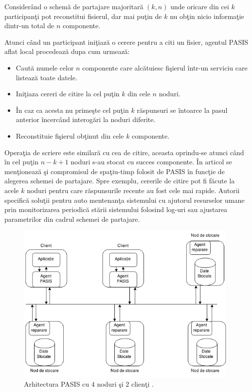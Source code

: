 \documentclass{llncs}
\begin{document}
Consider\^{a}nd o schem\u{a} de partajare majoritar\u{a} $(k, n)$ unde oricare din cei $k$ participan\c{t}i pot reconstitui fisierul, dar mai pu\c{t}in de $k$ nu ob\c{t}in nicio informa\c{t}ie dintr-un total de $n$ componente. 

Atunci c\^{a}nd un participant ini\c{t}iaz\u{a} o cerere pentru a citi un fisier, agentul PASIS aflat local procedeaz\u{a} dupa cum urmeaz\u{a}:
\begin{itemize}
	\item Caut\u{a} numele celor $n$ componente care alc\u{a}tuiesc fi\c{s}ierul \^{i}ntr-un serviciu care listeaz\u{a} toate datele.
	\item Ini\c{t}iaza cereri de citire la cel pu\c{t}in $k$ din cele $n$ noduri.
	\item \^{I}n caz ca acesta nu prime\c{s}te cel pu\c{t}in $k$ r\u{a}spunsuri se \^{i}ntoarce la pasul anterior \^{i}ncerc\^{a}nd interog\u{a}ri la noduri diferite.
	\item Reconstituie fi\c{s}ierul ob\c{t}inut din cele $k$ componente.
\end{itemize}
Opera\c{t}ia de scriere este similar\u{a} cu cea de citire, aceasta oprindu-se atunci c\^{a}nd \^{i}n cel pu\c{t}in $n - k + 1$ noduri s-au stocat cu succes componente.
\^{I}n articol se men\c{t}ioneaz\u{a} \c{s}i compromisul de spa\c{t}iu-timp folosit de PASIS \^{i}n func\c{t}ie de alegerea schemei de partajare. Spre exemplu, cererile de citire pot fi f\u{a}cute la acele $k$ noduri pentru care r\u{a}spunsurile recente au fost cele mai rapide.
Autorii specific\u{a} solu\c{t}ii pentru auto mentenan\c{t}a sistemului cu ajutorul resurselor umane prin monitorizarea periodic\u{a} st\u{a}rii sistemului folosind log-uri sau ajustarea parametrilor din cadrul schemei de partajare.

\begin{figure}
	\includegraphics[width=11cm]{img/PASIS.png}
	\caption{Arhitectura PASIS cu $4$ noduri \c{s}i $2$ clien\c{t}i \cite{W:2000}.}
	\label{fig:pasis}
	\bigskip
\end{figure}
\end{document}
